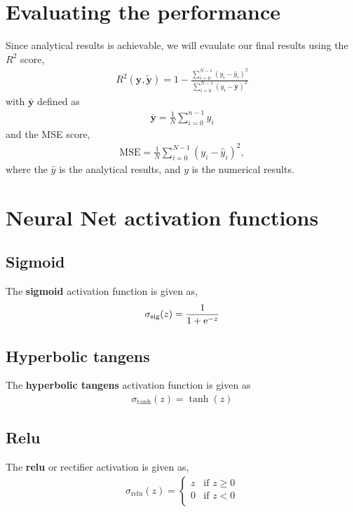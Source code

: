 \begin{appendices}
\section{Evaluating the performance}
Since analytical results is achievable, we will evaulate our final results using the $R^2$ score,
\begin{align}
    R^2(\bm{y},\tilde{\bm{y}}) = 1 - \frac{\sum_{i=0}^{N-1}(y_i - \hat{y}_i)^2}{\sum_{i=0}^{N-1}(y_i - \bar{\bm{y}})^2}
    \label{eq:r2}
\end{align}
with $\bar{\bm{y}}$ defined as 
\begin{align*}
    \bar{\bm{y}} = \frac{1}{N}\sum^{n-1}_{i=0} y_i
\end{align*}
and the MSE score,
\begin{align}
    \mathrm{MSE} = \frac{1}{N} \sum^{N-1}_{i=0} (y_i - \hat{y}_i)^2,
    \label{eq:mse}
\end{align}
where the $\hat{y}$ is the analytical results, and $y$ is the numerical results.

\section{Neural Net activation functions} \label{app:act-funcs}
\subsection{Sigmoid}
The \textbf{sigmoid} activation function is given as,
\begin{align}
    \sigma_\mathrm{sig} (z) = \frac{1}{1 + \mathrm{e}^{-z}}
    \label{eq:sigmoidal-activation}
\end{align}

\subsection{Hyperbolic tangens}
The \textbf{hyperbolic tangens} activation function is given as
\begin{align}
    \sigma_\mathrm{tanh}(z) = \tanh(z)
    \label{eq:act-tanh}
\end{align}

\subsection{Relu}
The \textbf{relu} or rectifier activation is given as,
\begin{align}
    \sigma_\mathrm{relu}(z) = 
    \begin{cases}
        z & \text{if } z \geq 0 \\
        0 & \text{if } z < 0 \\
    \end{cases}
    \label{eq:act-relu}
\end{align}


\end{appendices}
